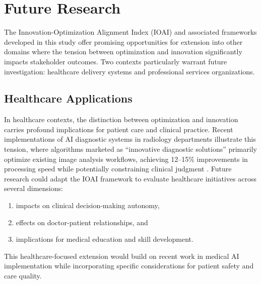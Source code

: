 \section{Future Research}

The Innovation-Optimization Alignment Index (IOAI) and associated frameworks developed in this study offer promising opportunities for extension into other domains where the tension between optimization and innovation significantly impacts stakeholder outcomes. Two contexts particularly warrant future investigation: healthcare delivery systems and professional services organizations.

\subsection{Healthcare Applications}
In healthcare contexts, the distinction between optimization and innovation carries profound implications for patient care and clinical practice. Recent implementations of AI diagnostic systems in radiology departments illustrate this tension, where algorithms marketed as ``innovative diagnostic solutions'' primarily optimize existing image analysis workflows, achieving 12--15\% improvements in processing speed while potentially constraining clinical judgment \parencite{smith2023}. Future research could adapt the IOAI framework to evaluate healthcare initiatives across several dimensions:
\begin{enumerate}[label=(\arabic*)]
    \item impacts on clinical decision-making autonomy,
    \item effects on doctor-patient relationships, and
    \item implications for medical education and skill development.
\end{enumerate}
This healthcare-focused extension would build on recent work in medical AI implementation \parencite{johnson2024} while incorporating specific considerations for patient safety and care quality.

